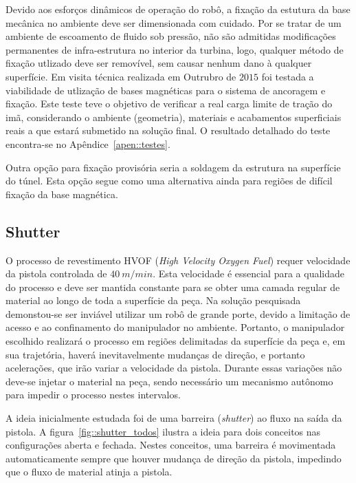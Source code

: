Devido aos esforços dinâmicos de operação do robô, a fixação da estutura da
base mecânica no ambiente deve ser dimensionada com cuidado. Por se
tratar de um ambiente de escoamento de fluido sob pressão, não são admitidas
modificações permanentes de infra-estrutura no interior da turbina, logo,
qualquer método de fixação utlizado deve ser removível, sem causar nenhum dano
à qualquer superfície. Em visita técnica realizada em Outrubro de $2015$ foi
testada a viabilidade de utlização de bases magnéticas para o sistema de
ancoragem e fixação. Este teste teve o objetivo de verificar a real carga limite de tração
do imã, considerando o ambiente (geometria), materiais e acabamentos
superficiais reais a que estará submetido na solução final. O resultado
detalhado do teste encontra-se no Apêndice~\ref{apen::testes}.

Outra opção para fixação provisória seria a soldagem da estrutura na
superfície do túnel. Esta opção segue como uma alternativa ainda para regiões
de difícil fixação da base magnética.
  
\subsection{Shutter}%
O processo de revestimento HVOF (\textit{High Velocity Oxygen Fuel}) requer
velocidade da pistola controlada de $40~m/min$. Esta velocidade é essencial para
a qualidade do processo e deve ser mantida constante para se obter uma camada 
regular de material ao longo de toda a superfície da peça. Na solução
pesquisada demonstou-se ser inviável utilizar um robô de grande porte, devido a
limitação de acesso e ao confinamento do manipulador no ambiente. Portanto, o
manipulador  escolhido realizará o processo em regiões delimitadas da
superfície da peça e, em sua trajetória, haverá inevitavelmente mudanças de
direção, e portanto acelerações, que irão variar a velocidade da pistola.
Durante essas variações não deve-se injetar o material na peça, sendo necessário um mecanismo
autônomo para impedir o processo nestes intervalos.

A ideia inicialmente estudada foi de uma barreira (\textit{shutter}) ao fluxo na
saída da pistola.
A figura~\ref{fig::shutter_todos} ilustra a ideia para dois conceitos nas
configurações aberta e fechada. 
Nestes conceitos, uma barreira é movimentada automaticamente sempre que houver
mudança de direção da pistola, impedindo que o fluxo de material atinja a
pistola. 

